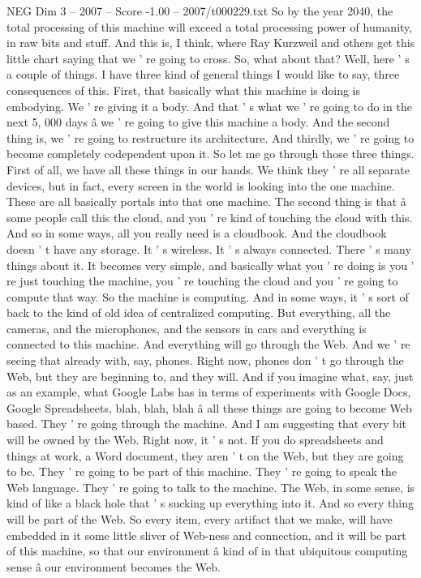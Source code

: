 \begin{textsample}{NEG Dim 3 – 2007 – Score -1.00 – 2007/t000229.txt}
So by the year 2040, the total processing of this machine will exceed a total processing power of humanity, in raw bits and stuff.
And this is, I think, where Ray Kurzweil and others get this little chart saying that we ' re going to cross.
So, what about that?
Well, here ' s a couple of things.
I have three kind of general things I would like to say, three consequences of this.
First, that basically what this machine is doing is embodying.
We ' re giving it a body.
And that ' s what we ' re going to do in the next 5, 000 days â we ' re going to give this machine a body.
And the second thing is, we ' re going to restructure its architecture.
And thirdly, we ' re going to become completely codependent upon it.
So let me go through those three things.
First of all, we have all these things in our hands.
We think they ' re all separate devices, but in fact, every screen in the world is looking into the one machine.
These are all basically portals into that one machine.
The second thing is that â some people call this the cloud, and you ' re kind of touching the cloud with this.
And so in some ways, all you really need is a cloudbook.
And the cloudbook doesn ' t have any storage.
It ' s wireless.
It ' s always connected.
There ' s many things about it.
It becomes very simple, and basically what you ' re doing is you ' re just touching the machine, you ' re touching the cloud and you ' re going to compute that way.
So the machine is computing.
And in some ways, it ' s sort of back to the kind of old idea of centralized computing.
But everything, all the cameras, and the microphones, and the sensors in cars and everything is connected to this machine.
And everything will go through the Web.
And we ' re seeing that already with, say, phones.
Right now, phones don ' t go through the Web, but they are beginning to, and they will.
And if you imagine what, say, just as an example, what Google Labs has in terms of experiments with Google Docs, Google Spreadsheets, blah, blah, blah â all these things are going to become Web based.
They ' re going through the machine.
And I am suggesting that every bit will be owned by the Web.
Right now, it ' s not.
If you do spreadsheets and things at work, a Word document, they aren ' t on the Web, but they are going to be.
They ' re going to be part of this machine.
They ' re going to speak the Web language.
They ' re going to talk to the machine.
The Web, in some sense, is kind of like a black hole that ' s sucking up everything into it.
And so every thing will be part of the Web.
So every item, every artifact that we make, will have embedded in it some little sliver of Web-ness and connection, and it will be part of this machine, so that our environment â kind of in that ubiquitous computing sense â our environment becomes the Web.

\end{textsample}
